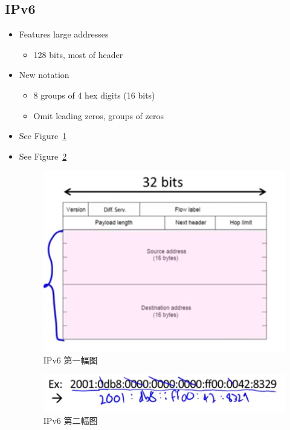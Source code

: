 \documentclass[12pt]{ctexart}   %
\begin{document}
	\subsection{IPv6}
	\begin{itemize}
		\item Features large addresses
		\begin{itemize}
			\item 128 bits, most of header
		\end{itemize}
		
		\item New notation
		\begin{itemize}
			\item 8 groups of 4 hex digits (16 bits)
			\item Omit leading zeros, groups of zeros
		\end{itemize}
		\item See Figure~\ref{fig:4-9-1}
		 \item See Figure~\ref{fig:4-9-2}
		
		\begin{figure}[h!] %
		\centering
		 \includegraphics[scale=0.7]{images/4-9-1}
		\caption{ IPv6  第一幅图 }
		 \label{fig:4-9-1}
		 \end{figure}

		\begin{figure}[h!] %
		\centering
		 \includegraphics[scale=0.7]{images/4-9-2}
		\caption{ IPv6 第二幅图}
		 \label{fig:4-9-2}
		 \end{figure}
		 

\end{itemize}
\end{document}
